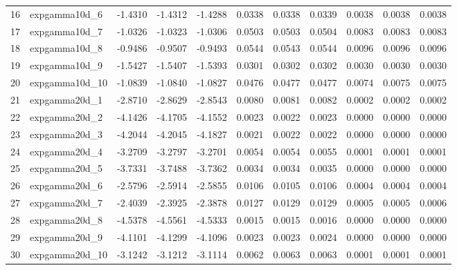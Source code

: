 \begin{table}[ht]
\begin{tabular}{rlrrrrrrrrr}
  16 & expgamma10d\_6 & -1.4310 & -1.4312 & -1.4288 & 0.0338 & 0.0338 & 0.0339 & 0.0038 & 0.0038 & 0.0038 \\ 
  17 & expgamma10d\_7 & -1.0326 & -1.0323 & -1.0306 & 0.0503 & 0.0503 & 0.0504 & 0.0083 & 0.0083 & 0.0083 \\ 
  18 & expgamma10d\_8 & -0.9486 & -0.9507 & -0.9493 & 0.0544 & 0.0543 & 0.0544 & 0.0096 & 0.0096 & 0.0096 \\ 
  19 & expgamma10d\_9 & -1.5427 & -1.5407 & -1.5393 & 0.0301 & 0.0302 & 0.0302 & 0.0030 & 0.0030 & 0.0030 \\ 
  20 & expgamma10d\_10& -1.0839 & -1.0840 & -1.0827 & 0.0476 & 0.0477 & 0.0477 & 0.0074 & 0.0075 & 0.0075 \\ 
  21 & expgamma20d\_1 & -2.8710 & -2.8629 & -2.8543 & 0.0080 & 0.0081 & 0.0082 & 0.0002 & 0.0002 & 0.0002 \\ 
  22 & expgamma20d\_2 & -4.1426 & -4.1705 & -4.1552 & 0.0023 & 0.0022 & 0.0023 & 0.0000 & 0.0000 & 0.0000 \\ 
  23 & expgamma20d\_3 & -4.2044 & -4.2045 & -4.1827 & 0.0021 & 0.0022 & 0.0022 & 0.0000 & 0.0000 & 0.0000 \\ 
  24 & expgamma20d\_4 & -3.2709 & -3.2797 & -3.2701 & 0.0054 & 0.0054 & 0.0055 & 0.0001 & 0.0001 & 0.0001 \\ 
  25 & expgamma20d\_5 & -3.7331 & -3.7488 & -3.7362 & 0.0034 & 0.0034 & 0.0035 & 0.0000 & 0.0000 & 0.0000 \\ 
  26 & expgamma20d\_6 & -2.5796 & -2.5914 & -2.5855 & 0.0106 & 0.0105 & 0.0106 & 0.0004 & 0.0004 & 0.0004 \\ 
  27 & expgamma20d\_7 & -2.4039 & -2.3925 & -2.3878 & 0.0127 & 0.0129 & 0.0129 & 0.0005 & 0.0005 & 0.0006 \\ 
  28 & expgamma20d\_8 & -4.5378 & -4.5561 & -4.5333 & 0.0015 & 0.0015 & 0.0016 & 0.0000 & 0.0000 & 0.0000 \\ 
  29 & expgamma20d\_9 & -4.1101 & -4.1299 & -4.1096 & 0.0023 & 0.0023 & 0.0024 & 0.0000 & 0.0000 & 0.0000 \\ 
  30 & expgamma20d\_10& -3.1242 & -3.1212 & -3.1114 & 0.0062 & 0.0063 & 0.0063 & 0.0001 & 0.0001 & 0.0001 \\ 
   \hline
\end{tabular}
\end{table}
